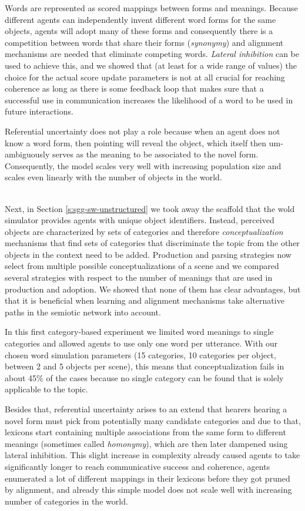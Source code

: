 Words are represented as scored mappings between forms and
meanings. Because different agents can independently invent different
word forms for the same objects, agents will adopt many of these forms
and consequently there is a competition between words that share their
forms (\emph{synonymy}) and alignment mechanisms are needed that
eliminate competing words. \emph{Lateral inhibition} can be used to
achieve this, and we showed that (at least for a wide range of values)
the choice for the actual score update parameters is not at all
crucial for reaching coherence as long as there is some feedback loop
that makes sure that a successful use in communication increases the
likelihood of a word to be used in future interactions.

Referential uncertainty does not play a role because when an agent
does not know a word form, then pointing will reveal the object, which
itself then um-ambiguously serves as the meaning to be associated to
the novel form. Consequently, the model scales very well with
increasing population size and scales even linearly with the number of
objects in the world.

~\\

 Next, in Section \ref{s:sgg-sw-unstructured} we took
away the scaffold that the wold simulator provides agents with unique
object identifiers. Instead, perceived objects are characterized by
sets of categories and therefore \emph{conceptualization} mechanisms
that find sets of categories that discriminate the topic from the
other objects in the context need to be added. Production and parsing
strategies now select from multiple possible conceptualizations of a
scene and we compared several strategies with respect to the number of
meanings that are used in production and adoption. We showed that none
of them has clear advantages, but that it is beneficial when learning
and alignment mechanisms take alternative paths in the semiotic
network into account.

In this first category-based experiment we limited word meanings to
single categories and allowed agents to use only one word per
utterance. With our chosen word simulation parameters (15 categories,
10 categories per object, between 2 and 5 objects per scene), this
means that conceptualization fails in about 45\% of the cases because
no single category can be found that is solely applicable to the
topic.

Besides that, referential uncertainty arises to an extend that hearers
hearing a novel form must pick from potentially many candidate
categories and due to that, lexicons start containing multiple
associations from the same form to different meanings (sometimes
called \emph{homonymy}), which are then later dampened using lateral
inhibition. This slight increase in complexity already caused agents
to take significantly longer to reach communicative success and
coherence, agents enumerated a lot of different mappings in their
lexicons before they got pruned by alignment, and already this simple
model does not scale well with increasing number of categories in the
world.


